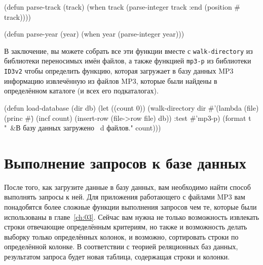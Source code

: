 \begin{myverb}
(defun parse-track (track)
  (when track (parse-integer track :end (position #\/ track))))

(defun parse-year (year)
  (when year (parse-integer year)))
\end{myverb}

В заключение, вы можете собрать все эти функции вместе с \lstinline{walk-directory} из
библиотеки переносимых имён файлов, а также функцией \lstinline{mp3-p} из библиотеки
\lstinline{ID3v2} чтобы определить функцию, которая загружает в базу данных MP3 информацию
извлечённую из файлов MP3, которые были найдены в определённом каталоге (и всех его
подкаталогах).

\begin{myverb}
(defun load-database (dir db)
  (let ((count 0))
    (walk-directory 
     dir 
     #'(lambda (file)
         (princ #\.)
         (incf count)
         (insert-row (file->row file) db))
     :test #'mp3-p)
    (format t "~&В базу данных загружено ~d файлов." count)))
\end{myverb}

\section{Выполнение запросов к базе данных}

После того, как загрузите данные в базу данных, вам необходимо найти способ выполнять
запросы к ней.  Для приложения работающего с файлами MP3 вам понадобятся более сложные
функции выполнения запросов чем те, которые были использованы в главе~\ref{ch:03}.  Сейчас
вам нужна не только возможность извлекать строки отвечающие определённым критериям, но
также и возможность делать выборку только определённых колонок, и возможно, сортировать
строки по определённой колонке.  В соответствии с теорией реляционных баз данных,
результатом запроса будет новая таблица, содержащая строки и колонки.

